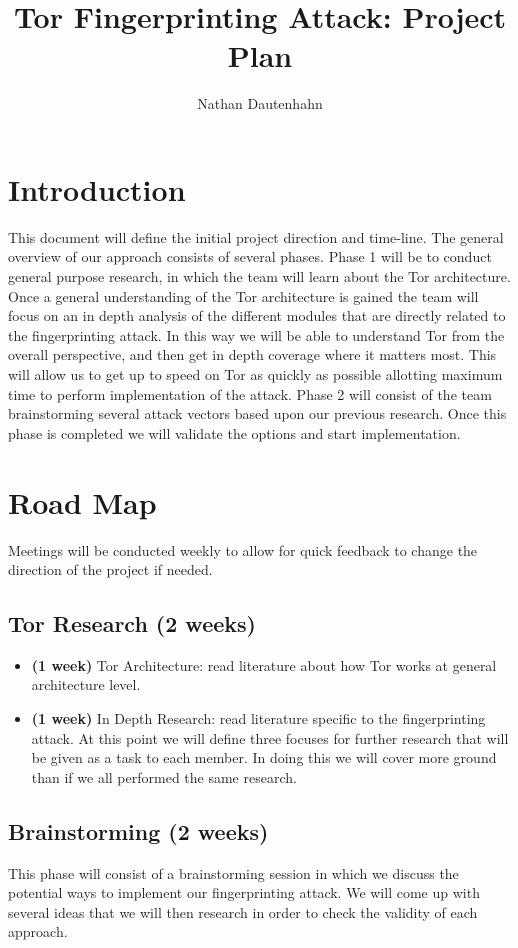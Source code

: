 \documentclass[10pt]{article}
\title{Tor Fingerprinting Attack: Project Plan}
\author{Nathan Dautenhahn}
\begin{document}
\maketitle

\section{Introduction}
This document will define the initial project direction and time-line.
The general overview of our approach consists of several phases. Phase 1
will be to conduct general purpose research, in which the team will learn
about the Tor architecture. Once a general understanding of the Tor 
architecture is gained the team will focus on an in depth analysis of 
the different modules that are directly related to the fingerprinting
attack. In this way we will be able to understand Tor from the overall 
perspective, and then get in depth coverage where it matters most. This
will allow us to get up to speed on Tor as quickly as possible allotting
maximum time to perform implementation of the attack. Phase 2 will 
consist of the team brainstorming several attack vectors based upon our
previous research. Once this phase is completed we will validate the 
options and start implementation. 

\section{Road Map}
Meetings will be conducted weekly to allow for quick feedback to change
the direction of the project if needed. 

\subsection{Tor Research (2 weeks)}
\begin{itemize}
	\item \textbf{(1 week)} Tor Architecture: read literature about how 
		Tor works at general architecture level. 
	\item \textbf{(1 week)} In Depth Research: read literature specific to the 
		fingerprinting attack. At this point we will define three
		focuses for further research that will be given as a task to each 
		member. In doing this we will cover more ground than if we all 
		performed the same research. 
\end{itemize}


\subsection{Brainstorming (2 weeks)}
This phase will consist of a brainstorming session in which we discuss the 
potential ways to implement our fingerprinting attack. We will come up with 
several ideas that we will then research in order to check the validity 
of each approach. 
\end{document}
